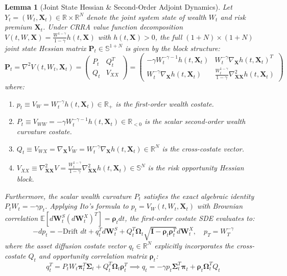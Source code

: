 \documentclass[11pt,a4paper]{article}
\theoremstyle{plain}
\newtheorem{lemma}[theorem]{Lemma}
\theoremstyle{definition}
\theoremstyle{remark}
\begin{document}
\begin{lemma}[Joint State Hessian \& Second-Order Adjoint Dynamics]
\label{lem:bsde_boundary}
Let $Y_t = (W_t, \mathbf{X}_t) \in \mathbb{R} \times \mathbb{R}^N$ denote the joint system state of wealth $W_t$ and risk premium $\mathbf{X}_t$. Under CRRA value function decomposition $V(t, W, \mathbf{X}) = \frac{W^{1-\gamma}}{1-\gamma} h(t, \mathbf{X})$ with $h(t, \mathbf{X}) > 0$, the full $(1+N) \times (1+N)$ joint state Hessian matrix $\mathbf{P}_t \in \mathbb{S}^{1+N}$ is given by the block structure:
\begin{equation}
    \mathbf{P}_t = \nabla^2 V(t, W_t, \mathbf{X}_t) = \begin{pmatrix} P_t & Q_t^T \\ Q_t & V_{XX} \end{pmatrix} = \begin{pmatrix} -\gamma W_t^{-\gamma-1} h(t, \mathbf{X}_t) & W_t^{-\gamma} \nabla_{\mathbf{X}} h(t, \mathbf{X}_t)^T \\ W_t^{-\gamma} \nabla_{\mathbf{X}} h(t, \mathbf{X}_t) & \frac{W_t^{1-\gamma}}{1-\gamma} \nabla_{\mathbf{XX}}^2 h(t, \mathbf{X}_t) \end{pmatrix}
\end{equation}
where:
\begin{enumerate}
    \item $p_t \equiv V_W = W_t^{-\gamma} h(t, \mathbf{X}_t) \in \mathbb{R}_+$ is the first-order wealth costate.
    \item $P_t \equiv V_{WW} = -\gamma W_t^{-\gamma-1} h(t, \mathbf{X}_t) \in \mathbb{R}_{<0}$ is the scalar second-order wealth curvature costate.
    \item $Q_t \equiv V_{WX} = \nabla_{\mathbf{X}} V_W = W_t^{-\gamma} \nabla_{\mathbf{X}} h(t, \mathbf{X}_t) \in \mathbb{R}^N$ is the cross-costate vector.
    \item $V_{XX} \equiv \nabla_{\mathbf{XX}}^2 V = \frac{W_t^{1-\gamma}}{1-\gamma} \nabla_{\mathbf{XX}}^2 h(t, \mathbf{X}_t) \in \mathbb{S}^N$ is the risk opportunity Hessian block.
\end{enumerate}
Furthermore, the scalar wealth curvature $P_t$ satisfies the exact algebraic identity $P_t W_t = -\gamma p_t$. Applying Ito's formula to $p_t = V_W(t, W_t, \mathbf{X}_t)$ with Brownian correlation $\mathbb{E}[d\mathbf{W}_t^S (d\mathbf{W}_t^X)^T] = \mathbf{\rho}_t dt$, the first-order costate SDE evaluates to:
\begin{equation}
    -dp_t = -\text{Drift } dt + q_t^T d\mathbf{W}_t^S + Q_t^T \mathbf{\Omega}_t \sqrt{\mathbf{I} - \mathbf{\rho}_t \mathbf{\rho}_t^T} d\mathbf{W}_t^X, \quad p_T = W_T^{-\gamma}
\end{equation}
where the asset diffusion costate vector $q_t \in \mathbb{R}^N$ explicitly incorporates the cross-costate $Q_t$ and opportunity correlation matrix $\mathbf{\rho}_t$:
\begin{equation}
    q_t^T = P_t W_t \mathbf{\pi}_t^T \mathbf{\Sigma}_t + Q_t^T \mathbf{\Omega}_t \mathbf{\rho}_t^T \implies q_t = -\gamma p_t \mathbf{\Sigma}_t^T \mathbf{\pi}_t + \mathbf{\rho}_t \mathbf{\Omega}_t^T Q_t
\end{equation}
\end{lemma}
\end{document}
